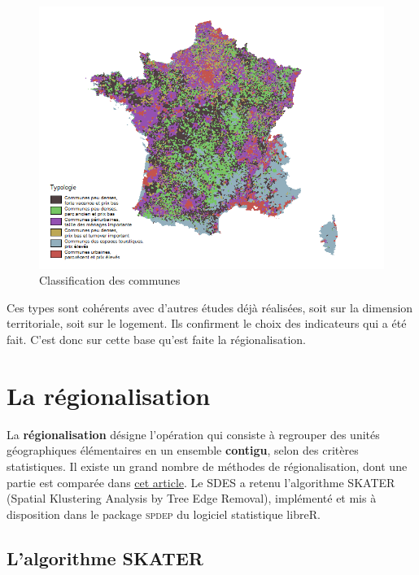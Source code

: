 \documentclass[12pt, a4paper]{article}
\begin{document}
\begin{center}
\begin{figure}[H]
\caption{Classification des communes}
\includegraphics[scale=.7]{img/Typo_com.png}
\end{figure}
\end{center}

Ces types sont cohérents avec d'autres études déjà réalisées, soit sur la dimension territoriale, soit sur  le logement. Ils confirment le choix des indicateurs qui a été fait. C'est donc sur cette base qu'est faite la régionalisation.


\section{La régionalisation}

La \textbf{régionalisation} désigne l'opération qui consiste à regrouper des unités géographiques élémentaires en un ensemble \textbf{contigu}, selon des critères statistiques. Il existe un grand nombre de méthodes de régionalisation, dont une partie est comparée dans \href{http://journals.sagepub.com/doi/pdf/10.1177/0160017607301605}{cet article}. Le SDES a retenu l'algorithme SKATER (Spatial Klustering Analysis by Tree Edge Removal), implémenté et mis à disposition dans le package \textsc{spdep} du logiciel statistique libre\textsc{R}.

\subsection{L'algorithme SKATER}
\end{document}
